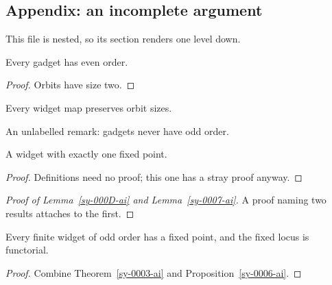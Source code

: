 \subsection{Appendix: an incomplete argument}\label{sy-0300-ai}

This file is nested, so its section renders one level down.

\begin{lemma}[Incomplete]\label{sy-000C-ai}
Every gadget has even order.
\end{lemma}
\begin{proof}
Orbits have size two. 
\end{proof}

\begin{lemma}\label{sy-000D-ai}
Every widget map preserves orbit sizes.
\end{lemma}

\begin{remark}
An unlabelled remark: gadgets never have odd order.
\end{remark}

\begin{definition}\label{sy-000E-ai}
A widget with exactly one fixed point.
\end{definition}
\begin{proof}
Definitions need no proof; this one has a stray proof anyway.
\end{proof}


\begin{proof}[Proof of Lemma~\ref{sy-000D-ai} and Lemma~\ref{sy-0007-ai}]
A proof naming two results attaches to the first.
\end{proof}

\begin{mainthm}\label{sy-000B-ai}
Every finite widget of odd order has a fixed point, and the fixed locus is functorial.
\end{mainthm}
\begin{proof}
Combine Theorem~\ref{sy-0003-ai} and Proposition~\ref{sy-0006-ai}.
\end{proof}





